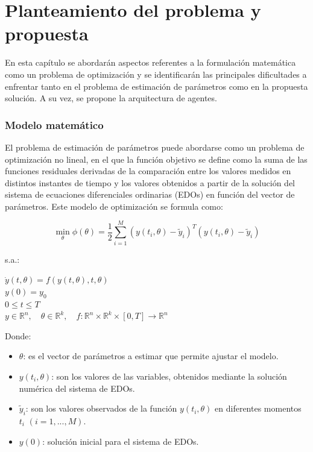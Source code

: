 \chapter{Planteamiento del problema y propuesta}\label{chapter:proposal}

\label{sec:14}

        En esta capítulo se abordarán aspectos referentes a la formulación matemática como un problema de optimización y se identificarán las principales 
        dificultades a enfrentar tanto en el problema de estimación de parámetros como en la propuesta solución. A su vez, se propone la arquitectura de agentes.

        \subsection*{ Modelo matemático}

        El problema de estimación de parámetros puede abordarse como un problema de optimización no lineal, en el que la función objetivo se define como la suma de las funciones residuales derivadas de la comparación entre los valores medidos en distintos instantes de tiempo y los valores obtenidos a partir de la solución del sistema de ecuaciones diferenciales ordinarias (EDOs) en función del vector de parámetros. Este modelo de optimización se formula como:

    \begin{equation}
        \min_{\theta} \phi(\theta) = \frac{1}{2} \sum_{i=1}^{M} (y(t_i, \theta) - \tilde{y}_i)^T (y(t_i,    \theta) - \tilde{y}_i)
    \end{equation}

    s.a.:


        \begin{center}

        $\dot{y}(t, \theta) = f(y(t, \theta), t, \theta)$ \\
        $y(0) = y_0$ \\
        $0 \leq t \leq T$ \\
        $y \in \mathbb{R}^n, \quad \theta \in \mathbb{R}^k, \quad f : \mathbb{R}^n \times \mathbb{R}^k \times [0, T] \rightarrow \mathbb{R}^n$

        \end{center}

    Donde:
    \begin{itemize}
        \item $\theta$: es el vector de parámetros a estimar que permite ajustar el modelo.
        \item $y(t_i, \theta)$: son los valores de las variables, obtenidos mediante la solución numérica del sistema de EDOs.
        \item $\tilde{y}_i$: son los valores observados de la función $y(t_i, \theta)$ en diferentes momentos $t_i$ $(i = 1, ..., M)$.
        \item $y(0)$: solución inicial para el sistema de EDOs.
    \end{itemize}

